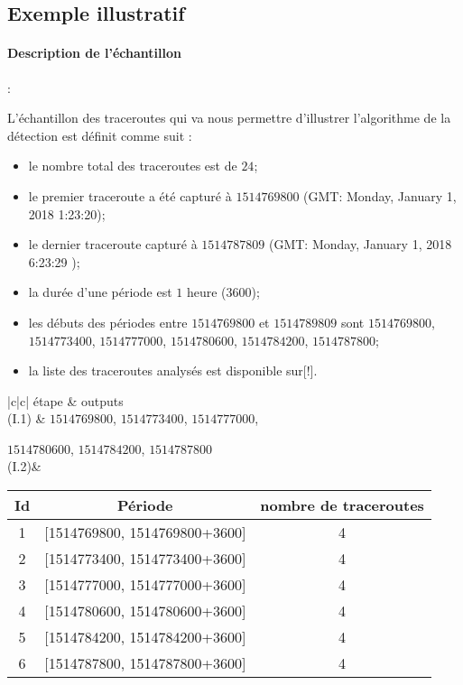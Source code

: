 \subsection{Exemple illustratif }

\paragraph{Description de  l'échantillon} :

L'échantillon des traceroutes qui va nous permettre d'illustrer l'algorithme de la détection est définit comme suit :

\begin{itemize}
	\item le nombre total des traceroutes est de $24$;
	\item le premier traceroute a été capturé à $1514769800$ (GMT: Monday, January 1, 2018 1:23:20);
	\item le dernier traceroute capturé à $1514787809$ (GMT: Monday, January 1, 2018 6:23:29 );
	\item la durée d'une période est $1$ heure ($3600$);
	\item les débuts des périodes entre $ 1514769800 $ et $ 1514789809 $ sont  $ 1514769800 $, $ 1514773400 $, $ 1514777000 $, $ 1514780600 $, $ 1514784200 $, $ 1514787800 $;
	\item la liste des traceroutes analysés est disponible sur[!].
\end{itemize} 




\begin{table}[H]
	\centering
	\begin{tabularx}{\linewidth}{|c|c|}
	étape &  outputs	\\ \hline
	(I.1) &   $ 1514769800 $, $ 1514773400 $, $ 1514777000 $,
	
	 $ 1514780600 $, $ 1514784200 $, $ 1514787800 $\\ \hline
(I.2)& 
				\begin{tabular}{ccc}
	Id&	Période& nombre de traceroutes \\ \hline
	1&	[1514769800, 1514769800+3600] & 4\\ \hline
	2&	[1514773400, 1514773400+3600] & 4\\ \hline
	3&	[1514777000, 1514777000+3600] & 4\\ \hline
	4&	[1514780600, 1514780600+3600] &4 \\ \hline
	5&	[1514784200, 1514784200+3600] &4 \\ \hline
	6&	[1514787800, 1514787800+3600] & 4 \\ \hline
				\end{tabular}\\ \hline
\end{tabularx}
\end{table}

